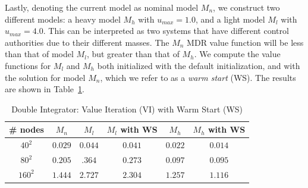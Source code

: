 Lastly, denoting the current model as nominal model $M_n$, we construct two different models: a heavy model $M_h$ with $u_{max}=1.0$, and a light model $M_l$ with $u_{max}=4.0$. This can be interpreted as two systems that have different control authorities due to their different masses. The $M_n$ MDR value function will be less than that of model $M_l$, but greater than that of $M_h$. We compute the value functions for $M_l$ and $M_h$ both initialized with the default initialization, and with the solution for model $M_n$, which we refer to as a \emph{warm start} (WS). The results are shown in Table~\ref{tab:ws_di}.

\begin{table}
\centering
\caption{Double Integrator: Value Iteration (VI) with Warm Start (WS)}
\label{tab:ws_di}
\begin{tabular}{|c| c| c| c| c| c|}
\hline
\# nodes & $M_n$ & $M_l$ &  $M_l$ with WS & $M_h$ & $M_h$ with WS \\ \hline
$40^2$ & $0.029$ & $0.044$ & $0.041$ & $0.022$ & $0.014$\\ \hline
$80^2$ & $0.205$ & $.364$ & $0.273$ & $0.097$ & $0.095$\\ \hline
$160^2$ & $1.444$ & $2.727$ & $2.304$ & $1.257$ & $1.116$\\ \hline
\end{tabular}
\end{table}



